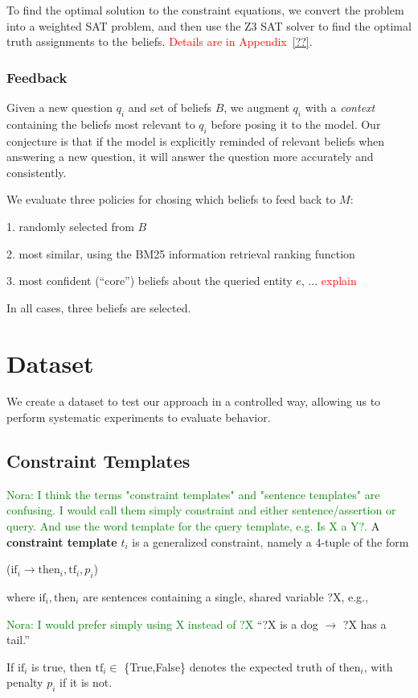 \documentclass[11pt]{article}
\newcommand{\nk}[1]{\textcolor{green}{Nora: #1}}
\newcommand{\red}[1]{\textcolor{red}{#1}}
\newenvironment{myquote}{                   %
  \parskip 0mm \begin{quoting}[vskip=0mm,leftmargin=2mm]}{
\end{quoting}}
\newenvironment{enu}{                   %
     \parskip 0cm \begin{list}{}{\parsep 0cm \itemsep 0cm \topsep 0cm}}{
       \end{list}} %
\begin{document}
To find the optimal solution to the constraint equations, we convert the problem into a weighted SAT problem,
and then use the Z3 SAT solver to find the optimal truth assignments to the beliefs. \red{Details are in
Appendix~\ref{??}}.

\subsubsection{Feedback}

Given a new question $q_i$ and set of beliefs $B$, we augment
$q_i$ with a {\it context} containing the beliefs most relevant to $q_i$
before posing it to the model. Our conjecture is that if the 
model is explicitly reminded of relevant beliefs when answering a new question,
it will answer the question more accurately and consistently.

We evaluate three policies for chosing which beliefs to feed back to $M$:
\begin{enu}
\item[1.] randomly selected from $B$
\item[2.] most similar, using the BM25 information retrieval ranking function \cite{bm25}
\item[3.] most confident (``core'') beliefs about the queried entity $e$, ... \red{explain}
\end{enu}
In all cases, three beliefs are selected.

\section{Dataset}

We create a dataset to test our approach in a controlled way, allowing us to perform systematic experiments to evaluate behavior.

\subsection{Constraint Templates}
\nk{I think the terms "constraint templates" and "sentence templates" are confusing. I would call them simply constraint and either sentence/assertion or query. And use the word template for the query template, e.g. Is X a Y?.}
A {\bf constraint template} $t_i$ is a generalized constraint, namely a 4-tuple of the form
\begin{myquote} \centering
($\textrm{if}_i \rightarrow \textrm{then}_i, \textrm{tf}_i, p_i$)
\end{myquote} 
where $\textrm{if}_i, \textrm{then}_i$ are sentences containing a single, shared variable ?X, e.g.,
\begin{myquote} \centering
\nk{I would prefer simply using X instead of ?X}
``?X is a dog $\rightarrow$ ?X has a tail.''
\end{myquote}
If $\textrm{if}_i$ is true, \textrm{then} $\textrm{tf}_i \in$ \{True,False\} denotes the expected truth of $\textrm{then}_i$, 
with penalty $p_i$ if it is not.
\end{document}
